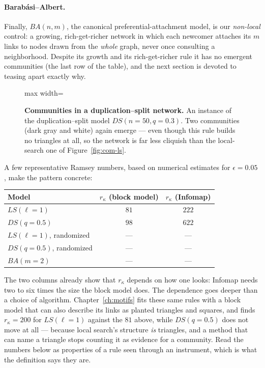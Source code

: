 \paragraph{Barab\'asi--Albert.} Finally, $BA(n,m)$, the canonical
preferential-attachment model, is our \emph{non-local} control: a growing,
rich-get-richer network in which each newcomer attaches its $m$ links to nodes
drawn from the \emph{whole} graph, never once consulting a neighborhood. Despite
its growth and its rich-get-richer rule it has no emergent communities (the last
row of the table), and the next section is devoted to teasing apart exactly why.

\begin{figure}[t]
\centering
\begin{adjustbox}{max width=\linewidth}\end{adjustbox}
\caption{\textbf{Communities in a duplication--split network.} An instance of the
duplication--split model $DS(n{=}50,q{=}0.3)$. Two communities (dark gray
and white) again emerge --- even though this rule builds no triangles at all, so the
network is far less cliquish than the local-search one of
Figure~\ref{fig:com-ls}.}
\label{fig:com-ds}
\end{figure}

A few representative Ramsey numbers, based on numerical estimates for $\epsilon=0.05$
\citep{vazquezcommunities2025}, make the pattern concrete:

\begin{center}
\begin{tabular}{lcc}
\hline
Model & $r_\kappa$ (block model) & $r_\kappa$ (Infomap) \\
\hline
$LS(\ell=1)$               & $81$   & $222$  \\
$DS(q=0.5)$             & $98$   & $622$  \\
$LS(\ell=1)$, randomized   & ---    & ---    \\
$DS(q=0.5)$, randomized & ---    & ---    \\
$BA(m=2)$               & ---    & ---    \\
\hline
\end{tabular}
\end{center}
The two columns already show that $r_\kappa$ depends on how one looks: Infomap
needs two to six times the size the block model does. The dependence goes deeper
than a choice of algorithm. Chapter~\ref{ch:motifs} fits these same rules with a
block model that can also describe its links as planted triangles and squares,
and finds $r_\kappa=200$ for $LS(\ell=1)$ against the $81$ above, while
$DS(q=0.5)$ does not move at all --- because local search's structure \emph{is}
triangles, and a method that can name a triangle stops counting it as evidence
for a community. Read the numbers below as properties of a rule seen through an
instrument, which is what the definition says they are.

